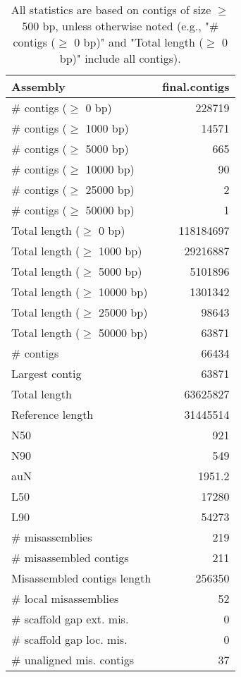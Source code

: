 \documentclass[12pt,a4paper]{article}
\begin{document}
\begin{table}[ht]
\begin{center}
\caption{All statistics are based on contigs of size $\geq$ 500 bp, unless otherwise noted (e.g., "\# contigs ($\geq$ 0 bp)" and "Total length ($\geq$ 0 bp)" include all contigs).}
\begin{tabular}{|l*{1}{|r}|}
\hline
Assembly & final.contigs \\ \hline
\# contigs ($\geq$ 0 bp) & 228719 \\ \hline
\# contigs ($\geq$ 1000 bp) & 14571 \\ \hline
\# contigs ($\geq$ 5000 bp) & 665 \\ \hline
\# contigs ($\geq$ 10000 bp) & 90 \\ \hline
\# contigs ($\geq$ 25000 bp) & 2 \\ \hline
\# contigs ($\geq$ 50000 bp) & 1 \\ \hline
Total length ($\geq$ 0 bp) & 118184697 \\ \hline
Total length ($\geq$ 1000 bp) & 29216887 \\ \hline
Total length ($\geq$ 5000 bp) & 5101896 \\ \hline
Total length ($\geq$ 10000 bp) & 1301342 \\ \hline
Total length ($\geq$ 25000 bp) & 98643 \\ \hline
Total length ($\geq$ 50000 bp) & 63871 \\ \hline
\# contigs & 66434 \\ \hline
Largest contig & 63871 \\ \hline
Total length & 63625827 \\ \hline
Reference length & 31445514 \\ \hline
N50 & 921 \\ \hline
N90 & 549 \\ \hline
auN & 1951.2 \\ \hline
L50 & 17280 \\ \hline
L90 & 54273 \\ \hline
\# misassemblies & 219 \\ \hline
\# misassembled contigs & 211 \\ \hline
Misassembled contigs length & 256350 \\ \hline
\# local misassemblies & 52 \\ \hline
\# scaffold gap ext. mis. & 0 \\ \hline
\# scaffold gap loc. mis. & 0 \\ \hline
\# unaligned mis. contigs & 37 \\ \hline

\end{tabular}
\end{center}
\end{table}
\end{document}
